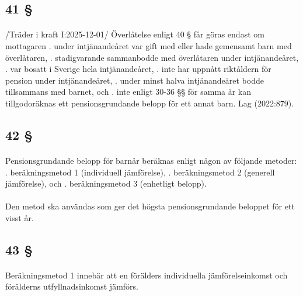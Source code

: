 \documentclass[a4paper,notitlepage,openany,10pt]{book}
\begin{document}
\subsection*{41 §}
\paragraph*{}
/Träder i kraft I:2025-12-01/
Överlåtelse enligt 40 § får göras endast om mottagaren
. under intjänandeåret var gift med eller hade gemensamt barn med överlåtaren,
. stadigvarande sammanbodde med överlåtaren under intjänandeåret,
. var bosatt i Sverige hela intjänandeåret,
. inte har uppnått riktåldern för pension under intjänandeåret,
. under minst halva intjänandeåret bodde tillsammans med barnet, och
. inte enligt 30-36 §§ för samma år kan tillgodoräknas ett pensionsgrundande belopp för ett annat barn.
Lag (2022:879).
\subsection*{42 §}
\paragraph*{}
Pensionsgrundande belopp för barnår beräknas enligt någon av följande metoder:
. beräkningsmetod 1 (individuell jämförelse),
. beräkningsmetod 2 (generell jämförelse), och
. beräkningsmetod 3 (enhetligt belopp).
\paragraph*{}
Den metod ska användas som ger det högsta pensionsgrundande beloppet för ett visst år.
\subsection*{43 §}
\paragraph*{}
Beräkningsmetod 1 innebär att en förälders individuella jämförelseinkomst och förälderns utfyllnadsinkomst jämförs.
\end{document}
